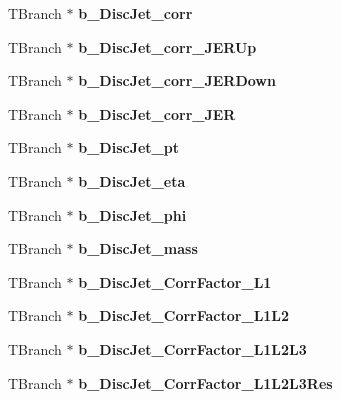 \begin{DoxyCompactItemize}
T\+Branch $\ast$ {\bfseries b\+\_\+\+Disc\+Jet\+\_\+corr}
\item 
\hypertarget{classMiniTree_afd3d51c8caa60c80fa8a789e8bb65482}{}\label{classMiniTree_afd3d51c8caa60c80fa8a789e8bb65482} 
T\+Branch $\ast$ {\bfseries b\+\_\+\+Disc\+Jet\+\_\+corr\+\_\+\+J\+E\+R\+Up}
\item 
\hypertarget{classMiniTree_ac80fa55038be434266f0526b4f9241a7}{}\label{classMiniTree_ac80fa55038be434266f0526b4f9241a7} 
T\+Branch $\ast$ {\bfseries b\+\_\+\+Disc\+Jet\+\_\+corr\+\_\+\+J\+E\+R\+Down}
\item 
\hypertarget{classMiniTree_a042c45d64bf4085c6e8f51a4328a6a30}{}\label{classMiniTree_a042c45d64bf4085c6e8f51a4328a6a30} 
T\+Branch $\ast$ {\bfseries b\+\_\+\+Disc\+Jet\+\_\+corr\+\_\+\+J\+ER}
\item 
\hypertarget{classMiniTree_a2a80d7a04a80b9ccfa483df7982d3e54}{}\label{classMiniTree_a2a80d7a04a80b9ccfa483df7982d3e54} 
T\+Branch $\ast$ {\bfseries b\+\_\+\+Disc\+Jet\+\_\+pt}
\item 
\hypertarget{classMiniTree_aab372ef92847e36e5643d3ae24e39b1d}{}\label{classMiniTree_aab372ef92847e36e5643d3ae24e39b1d} 
T\+Branch $\ast$ {\bfseries b\+\_\+\+Disc\+Jet\+\_\+eta}
\item 
\hypertarget{classMiniTree_a5ba71dada82e42d53334c60fced0a171}{}\label{classMiniTree_a5ba71dada82e42d53334c60fced0a171} 
T\+Branch $\ast$ {\bfseries b\+\_\+\+Disc\+Jet\+\_\+phi}
\item 
\hypertarget{classMiniTree_aa76206904516ed0f895d5d59f0ff6e2c}{}\label{classMiniTree_aa76206904516ed0f895d5d59f0ff6e2c} 
T\+Branch $\ast$ {\bfseries b\+\_\+\+Disc\+Jet\+\_\+mass}
\item 
\hypertarget{classMiniTree_af1dfc3d6f592aa05db06d386d5ff816c}{}\label{classMiniTree_af1dfc3d6f592aa05db06d386d5ff816c} 
T\+Branch $\ast$ {\bfseries b\+\_\+\+Disc\+Jet\+\_\+\+Corr\+Factor\+\_\+\+L1}
\item 
\hypertarget{classMiniTree_a0271f5a257a96b82b65c0a7ab617b277}{}\label{classMiniTree_a0271f5a257a96b82b65c0a7ab617b277} 
T\+Branch $\ast$ {\bfseries b\+\_\+\+Disc\+Jet\+\_\+\+Corr\+Factor\+\_\+\+L1\+L2}
\item 
\hypertarget{classMiniTree_a33ab2b3190942e8e21e93eb125edafe3}{}\label{classMiniTree_a33ab2b3190942e8e21e93eb125edafe3} 
T\+Branch $\ast$ {\bfseries b\+\_\+\+Disc\+Jet\+\_\+\+Corr\+Factor\+\_\+\+L1\+L2\+L3}
\item 
\hypertarget{classMiniTree_aa541512c8760f98b955efbe289f4ddb2}{}\label{classMiniTree_aa541512c8760f98b955efbe289f4ddb2} 
T\+Branch $\ast$ {\bfseries b\+\_\+\+Disc\+Jet\+\_\+\+Corr\+Factor\+\_\+\+L1\+L2\+L3\+Res}

\end{DoxyCompactItemize}
